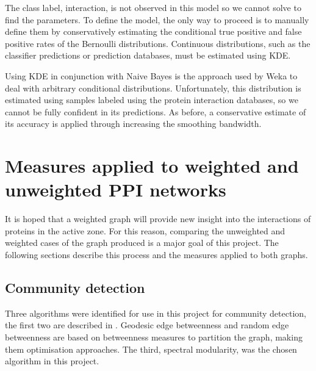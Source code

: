 The class label, interaction, is not observed in this model so we cannot solve to find the parameters.
To define the model, the only way to proceed is to manually define them by conservatively estimating the conditional true positive and false positive rates of the Bernoulli distributions.
Continuous distributions, such as the classifier predictions or prediction databases, must be estimated using \ac{KDE}. 

Using \ac{KDE} in conjunction with Naive Bayes is the approach used by Weka to deal with arbitrary conditional distributions\autocite{john_estimating_1995}.
Unfortunately, this distribution is estimated using samples labeled using the protein interaction databases, so we cannot be fully confident in its predictions.
As before, a conservative estimate of its accuracy is applied through increasing the smoothing bandwidth.

\section{Measures applied to weighted and unweighted \ac{PPI} networks}

It is hoped that a weighted graph will provide new insight into the interactions of proteins in the active zone.
For this reason, comparing the unweighted and weighted cases of the graph produced is a major goal of this project.
The following sections describe this process and the measures applied to both graphs.

\subsection{Community detection}
\label{communitydetection}
Three algorithms were identified for use in this project for community detection, the first two are described in \textcite{newman_finding_2004}.
Geodesic edge betweenness and random edge betweenness are based on betweenness measures to partition the graph, making them optimisation approaches.
The third, spectral modularity, was the chosen algorithm in this project.

